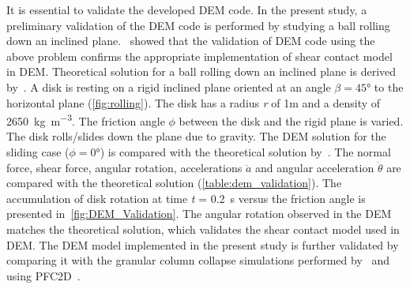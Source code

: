 It is essential to validate the developed DEM code. In the present study, a 
preliminary validation of the DEM code is performed by studying a ball rolling 
down an inclined plane.~\citet{O'Sullivan2003} showed that the validation of 
DEM code using the above problem confirms the appropriate implementation of 
shear contact model in DEM. Theoretical solution for a ball rolling down an 
inclined plane is derived by~\cite{Ke1995}. A disk is resting on a rigid 
inclined plane oriented at an angle $\beta = 45\si{\degree}$ to the horizontal 
plane (\cref{fig:rolling}). The disk has a radius \textit{r} of 1\si{m} and a 
density of 2650~\si{\kg\per\m\cubed}. The friction angle $\phi$ between the 
disk and the rigid plane is varied. The disk rolls/slides down the plane due to 
gravity. The DEM solution for the sliding case ($\phi=0\si{\degree}$) is 
compared with the theoretical solution by~\citet{Ke1995}. The normal force, 
shear force, angular rotation, accelerations $\ddot{a}$ and angular 
acceleration $\ddot{\theta}$ are compared with the theoretical solution 
(\cref{table:dem_validation}). The accumulation of disk rotation at time 
\textit{t} = 0.2~\si{\s} versus the friction angle is presented 
in~\cref{fig:DEM_Validation}. The angular rotation observed in the DEM matches 
the theoretical solution, which validates the shear contact model used in DEM. 
The DEM model implemented in the present study is further validated by 
comparing it with the granular column collapse simulations performed 
by~\citet{Zenit2005} and using PFC2D~\citep{ItascaPFC2D1998}.


